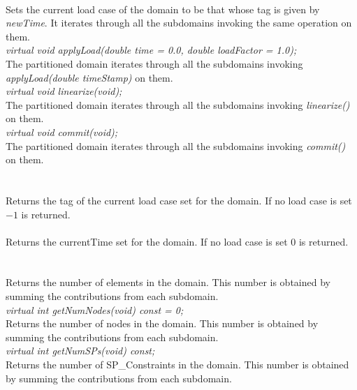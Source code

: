  \\
Sets the current load case of the domain to be that whose tag is given
by {\em newTime}. It iterates through all the subdomains invoking the
same operation on them. \\

{\em virtual void applyLoad(double time = 0.0, double loadFactor
= 1.0);} \\
The partitioned domain iterates through all the subdomains invoking {\em
applyLoad(double timeStamp)} on them. \\

{\em virtual void linearize(void);} \\
The partitioned domain iterates through all the subdomains invoking {\em
linearize()} on them. \\


{\em virtual void commit(void);} \\
The partitioned domain iterates through all the subdomains invoking {\em
commit()} on them. \\

  \\
 \\
Returns the tag of the current load case set for the domain. If no
load case is set $-1$ is returned. \\

 \\
Returns the currentTime set for the domain. If no load case is set $0$
is returned. \\ 

  \\
\\
Returns the number of elements in the domain. This number is obtained
by summing the contributions from each subdomain. \\

{\em virtual int getNumNodes(void) const = 0;}\\
Returns the number of nodes in the domain.
This number is obtained by summing the contributions from each subdomain. \\

{\em virtual int getNumSPs(void) const;}\\
Returns the number of SP\_Constraints in the domain. 
This number is obtained by summing the contributions from each subdomain. \\

